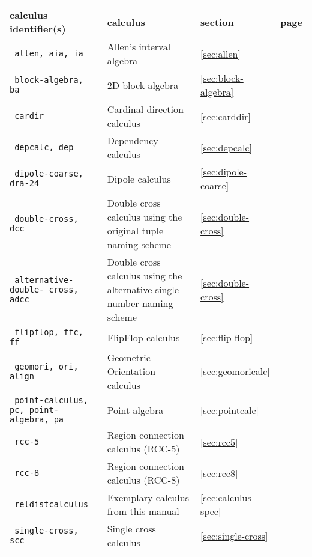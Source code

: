 \documentclass[headsepline]{scrreprt}
\theoremstyle{definition}
\begin{document}
\renewcommand{\arraystretch}{1.5}
\begin{center}
\begin{longtable}{|p{4cm}p{6cm}ll|}\hline
	{\bfseries calculus identifier(s)} & {\bfseries calculus} & {\bfseries section} & {\bfseries page}\\ \hline \hline
%
	\texttt{ allen, aia, ia} & Allen's interval algebra \citep{allen83} & \ref{sec:allen} & \pageref{sec:allen} \\
	\texttt{ block-algebra, ba} & 2D block-algebra \citep{guesgen:89} & \ref{sec:block-algebra} & \pageref{sec:block-algebra} \\
	\texttt{ cardir} & Cardinal direction calculus \citep{ligozat98_carddir}  & \ref{sec:carddir} & \pageref{sec:carddir} \\
	\texttt{ depcalc, dep} & Dependency calculus \citep{Ragni05_DepCalc} & \ref{sec:depcalc} & \pageref{sec:depcalc} \\
	\texttt{ dipole-coarse, dra-24} & Dipole calculus \citep{moratz-renz-wolter-ECAI:00} & \ref{sec:dipole-coarse} & \pageref{sec:dipole-coarse} \\
	\texttt{ double-cross, dcc} & Double cross calculus \citep{cosyfre92} using the original tuple naming scheme & \ref{sec:double-cross} & \pageref{sec:double-cross} \\
	\texttt{ alternative-double- cross, adcc} & Double cross calculus \citep{cosyfre92} using the alternative single number naming scheme & \ref{sec:double-cross} & \pageref{sec:double-cross} \\
	\texttt{ flipflop, ffc, ff} & FlipFlop calculus \citep{Ligozat93_FlipFlopCalculus}& \ref{sec:flip-flop} & \pageref{sec:flip-flop} \\
	\texttt{ geomori, ori, align} & Geometric Orientation calculus & \ref{sec:geomoricalc} & \pageref{sec:geomoricalc} \\
	\texttt{ point-calculus, pc, point-algebra, pa} & Point algebra \citep{vilain_kautz_beek_89_constraint} & \ref{sec:pointcalc} & \pageref{sec:pointcalc} \\
	\texttt{ rcc-5} & Region connection calculus (RCC-5) \citep{randell92_rccb} & \ref{sec:rcc5} & \pageref{sec:rcc5} \\
	\texttt{ rcc-8} & Region connection calculus (RCC-8) \citep{randell92_rccb} & \ref{sec:rcc8} & \pageref{sec:rcc8} \\
	\texttt{ reldistcalculus} & Exemplary calculus from this manual & \ref{sec:calculus-spec} & \pageref{sec:calculus-spec}\\
	\texttt{ single-cross, scc} & Single cross calculus \citep{cosyfre92} & \ref{sec:single-cross} & \pageref{sec:single-cross} \\

\end{longtable}
\end{center}
\end{document}
